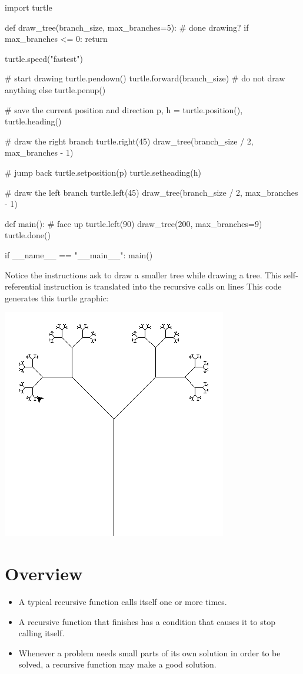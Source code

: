 \documentclass[11pt]{cselabheader}
\begin{document}
\begin{python3code}
import turtle

def draw_tree(branch_size, max_branches=5):
    # done drawing?
    if max_branches <= 0:
        return

    turtle.speed("fastest")

    # start drawing
    turtle.pendown()
    turtle.forward(branch_size)
    # do not draw anything else
    turtle.penup()

    # save the current position and direction
    p, h = turtle.position(), turtle.heading()

    # draw the right branch
    turtle.right(45)
    draw_tree(branch_size / 2, max_branches - 1)

    # jump back
    turtle.setposition(p)
    turtle.setheading(h)

    # draw the left branch
    turtle.left(45)
    draw_tree(branch_size / 2, max_branches - 1)

def main():
    # face up
    turtle.left(90)
    draw_tree(200, max_branches=9)
    turtle.done()

if __name__ == "__main__":
    main()
\end{python3code}

Notice the instructions ask to draw a smaller tree while drawing a tree.
This self-referential instruction is translated into the recursive calls
on lines %
This code generates this turtle graphic:

\begin{center}
\includegraphics[width=0.5\linewidth]{img/tree.png}
\end{center}

\section{Overview}
\begin{itemize}
\item A typical recursive function calls itself one or more times.
\item A recursive function that finishes has a condition that causes
it to stop calling itself.
\item Whenever a problem needs small parts of its own solution in
order to be solved, a recursive function may make a good solution.
\end{itemize}
\end{document}

